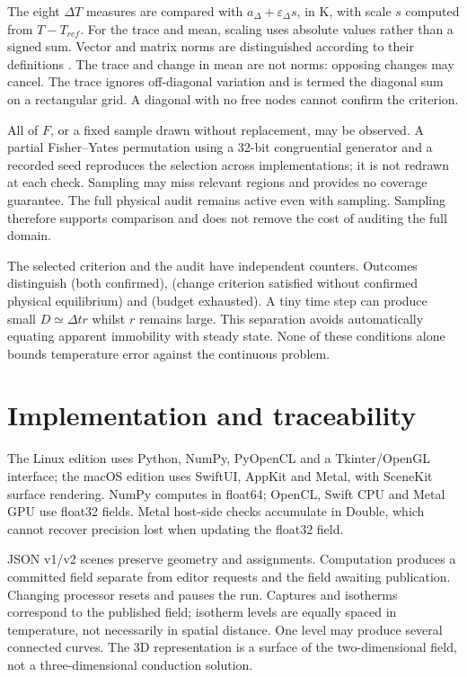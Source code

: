 \documentclass[11pt,a4paper]{article}
\newcommand{\code}[1]{\texttt{\detokenize{#1}}}
\newcommand{\dt}{\Delta t}
\begin{document}
The eight $\Delta T$ measures are compared with $a_\Delta+\varepsilon_\Delta s$, in K, with scale $s$ computed from $T-T_{ref}$. For the trace and mean, scaling uses absolute values rather than a signed sum. Vector and matrix norms are distinguished according to their definitions \cite{numpy-norm}. The trace and change in mean are not norms: opposing changes may cancel. The trace ignores off-diagonal variation and is termed the diagonal sum on a rectangular grid. A diagonal with no free nodes cannot confirm the criterion.

All of $F$, or a fixed sample drawn without replacement, may be observed. A partial Fisher--Yates permutation using a 32-bit congruential generator and a recorded seed reproduces the selection across implementations; it is not redrawn at each check. Sampling may miss relevant regions and provides no coverage guarantee. The full physical audit remains active even with sampling. Sampling therefore supports comparison and does not remove the cost of auditing the full domain.

The selected criterion and the audit have independent counters. Outcomes distinguish \code{converged} (both confirmed), \code{criterion_met} (change criterion satisfied without confirmed physical equilibrium) and \code{max_steps} (budget exhausted). A tiny time step can produce small $D\simeq\dt r$ whilst $r$ remains large. This separation avoids automatically equating apparent immobility with steady state. None of these conditions alone bounds temperature error against the continuous problem.

\section{Implementation and traceability}
The Linux edition uses Python, NumPy, PyOpenCL and a Tkinter/OpenGL interface; the macOS edition uses SwiftUI, AppKit and Metal, with SceneKit surface rendering. NumPy computes in float64; OpenCL, Swift CPU and Metal GPU use float32 fields. Metal host-side checks accumulate in Double, which cannot recover precision lost when updating the float32 field.

JSON v1/v2 scenes preserve geometry and assignments. Computation produces a committed field separate from editor requests and the field awaiting publication. Changing processor resets and pauses the run. Captures and isotherms correspond to the published field; isotherm levels are equally spaced in temperature, not necessarily in spatial distance. One level may produce several connected curves. The 3D representation is a surface of the two-dimensional field, not a three-dimensional conduction solution.
\end{document}
